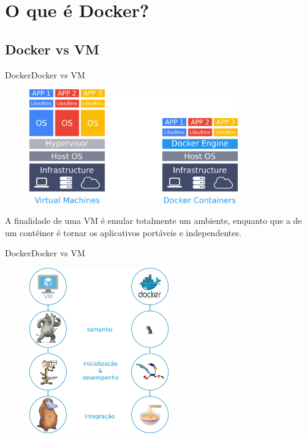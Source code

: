 \section{O que é Docker?}

\subsection{Docker vs VM}
\begin{frame}{Docker}{Docker vs VM}
  \begin{figure}[ht!]
    \centering
    \includegraphics[width=90mm]{images/vm_docker.png}
  \end{figure}
  A finalidade de uma VM é emular totalmente um ambiente, enquanto que a de um contêiner é tornar os aplicativos portáveis e independentes.
\end{frame}

\begin{frame}{Docker}{Docker vs VM}
  \begin{figure}[ht!]
    \centering
    \includegraphics[width=60mm]{images/features.png}
  \end{figure}
\end{frame}

